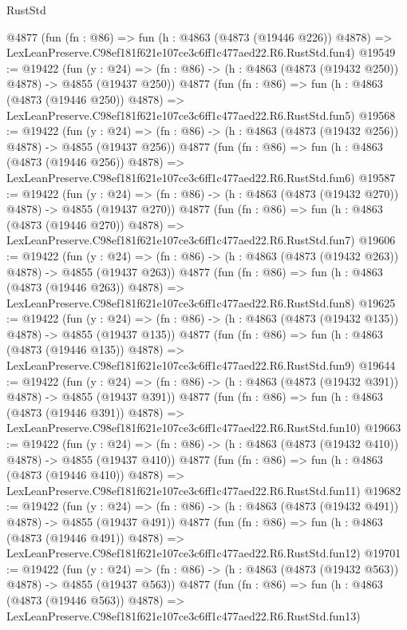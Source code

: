 \begin{lexlean}{RustStd}
\begin{coremodule}
    @4877
    (fun (fn : @86) =>
    fun (h : @4863 (@4873 (@19446 @226)) @4878) =>
    LexLeanPreserve.C98ef181f621e107ce3c6ff1c477aed22.R6.RustStd.fun4)
@19549 := @19422
    (fun (y : @24) => (fn : @86) -> (h : @4863 (@4873 (@19432 @250)) @4878) -> @4855 (@19437 @250))
    @4877
    (fun (fn : @86) =>
    fun (h : @4863 (@4873 (@19446 @250)) @4878) =>
    LexLeanPreserve.C98ef181f621e107ce3c6ff1c477aed22.R6.RustStd.fun5)
@19568 := @19422
    (fun (y : @24) => (fn : @86) -> (h : @4863 (@4873 (@19432 @256)) @4878) -> @4855 (@19437 @256))
    @4877
    (fun (fn : @86) =>
    fun (h : @4863 (@4873 (@19446 @256)) @4878) =>
    LexLeanPreserve.C98ef181f621e107ce3c6ff1c477aed22.R6.RustStd.fun6)
@19587 := @19422
    (fun (y : @24) => (fn : @86) -> (h : @4863 (@4873 (@19432 @270)) @4878) -> @4855 (@19437 @270))
    @4877
    (fun (fn : @86) =>
    fun (h : @4863 (@4873 (@19446 @270)) @4878) =>
    LexLeanPreserve.C98ef181f621e107ce3c6ff1c477aed22.R6.RustStd.fun7)
@19606 := @19422
    (fun (y : @24) => (fn : @86) -> (h : @4863 (@4873 (@19432 @263)) @4878) -> @4855 (@19437 @263))
    @4877
    (fun (fn : @86) =>
    fun (h : @4863 (@4873 (@19446 @263)) @4878) =>
    LexLeanPreserve.C98ef181f621e107ce3c6ff1c477aed22.R6.RustStd.fun8)
@19625 := @19422
    (fun (y : @24) => (fn : @86) -> (h : @4863 (@4873 (@19432 @135)) @4878) -> @4855 (@19437 @135))
    @4877
    (fun (fn : @86) =>
    fun (h : @4863 (@4873 (@19446 @135)) @4878) =>
    LexLeanPreserve.C98ef181f621e107ce3c6ff1c477aed22.R6.RustStd.fun9)
@19644 := @19422
    (fun (y : @24) => (fn : @86) -> (h : @4863 (@4873 (@19432 @391)) @4878) -> @4855 (@19437 @391))
    @4877
    (fun (fn : @86) =>
    fun (h : @4863 (@4873 (@19446 @391)) @4878) =>
    LexLeanPreserve.C98ef181f621e107ce3c6ff1c477aed22.R6.RustStd.fun10)
@19663 := @19422
    (fun (y : @24) => (fn : @86) -> (h : @4863 (@4873 (@19432 @410)) @4878) -> @4855 (@19437 @410))
    @4877
    (fun (fn : @86) =>
    fun (h : @4863 (@4873 (@19446 @410)) @4878) =>
    LexLeanPreserve.C98ef181f621e107ce3c6ff1c477aed22.R6.RustStd.fun11)
@19682 := @19422
    (fun (y : @24) => (fn : @86) -> (h : @4863 (@4873 (@19432 @491)) @4878) -> @4855 (@19437 @491))
    @4877
    (fun (fn : @86) =>
    fun (h : @4863 (@4873 (@19446 @491)) @4878) =>
    LexLeanPreserve.C98ef181f621e107ce3c6ff1c477aed22.R6.RustStd.fun12)
@19701 := @19422
    (fun (y : @24) => (fn : @86) -> (h : @4863 (@4873 (@19432 @563)) @4878) -> @4855 (@19437 @563))
    @4877
    (fun (fn : @86) =>
    fun (h : @4863 (@4873 (@19446 @563)) @4878) =>
    LexLeanPreserve.C98ef181f621e107ce3c6ff1c477aed22.R6.RustStd.fun13)

\end{coremodule}
\end{lexlean}
